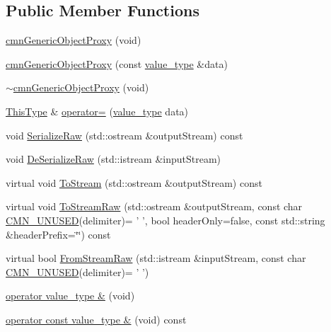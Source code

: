 \subsection*{Public Member Functions}
\begin{DoxyCompactItemize}
\item 
\hyperlink{classcmn_generic_object_proxy_a3a7b07e56467bd563879e5e3fa71b3bf}{cmn\-Generic\-Object\-Proxy} (void)
\item 
\hyperlink{classcmn_generic_object_proxy_aec23f04b937e22288af731b9c9714b02}{cmn\-Generic\-Object\-Proxy} (const \hyperlink{classcmn_generic_object_proxy_a5a3db96e5acd73055d5d34c25c1635f3}{value\-\_\-type} \&data)
\item 
\hyperlink{classcmn_generic_object_proxy_aea3ad15723db9a0c1924936fd25910e6}{$\sim$cmn\-Generic\-Object\-Proxy} (void)
\item 
\hyperlink{classcmn_generic_object_proxy_a4ad0391ca48ebfb86d6bbda89a98c99d}{This\-Type} \& \hyperlink{classcmn_generic_object_proxy_aa4c5ad5bd8655ed6974c9dcbf096dc90}{operator=} (\hyperlink{classcmn_generic_object_proxy_a5a3db96e5acd73055d5d34c25c1635f3}{value\-\_\-type} data)
\item 
void \hyperlink{classcmn_generic_object_proxy_adaa26a00b9f13b78647282c0badc6cb2}{Serialize\-Raw} (std\-::ostream \&output\-Stream) const 
\item 
void \hyperlink{classcmn_generic_object_proxy_a62d6acac550f9e25469256e2cec9edb9}{De\-Serialize\-Raw} (std\-::istream \&input\-Stream)
\item 
virtual void \hyperlink{classcmn_generic_object_proxy_a595129d5bb131263104a840967c7580d}{To\-Stream} (std\-::ostream \&output\-Stream) const 
\item 
virtual void \hyperlink{classcmn_generic_object_proxy_a7741c043f8f9c07559b6a66d8e411fe6}{To\-Stream\-Raw} (std\-::ostream \&output\-Stream, const char \hyperlink{cmn_portability_8h_a021894e2626935fa2305434b1e893ff6}{C\-M\-N\-\_\-\-U\-N\-U\-S\-E\-D}(delimiter)= ' ', bool header\-Only=false, const std\-::string \&header\-Prefix=\char`\"{}\char`\"{}) const 
\item 
virtual bool \hyperlink{classcmn_generic_object_proxy_af76004eb71b542b5e96d1790db55156d}{From\-Stream\-Raw} (std\-::istream \&input\-Stream, const char \hyperlink{cmn_portability_8h_a021894e2626935fa2305434b1e893ff6}{C\-M\-N\-\_\-\-U\-N\-U\-S\-E\-D}(delimiter)= ' ')
\end{DoxyCompactItemize}
{\bf }\par
\begin{DoxyCompactItemize}
\item 
\hyperlink{classcmn_generic_object_proxy_ad73eae195ede0ec2a76eea5782ad7662}{operator value\-\_\-type \&} (void)
\item 
\hyperlink{classcmn_generic_object_proxy_ae14120d331171dfd20e03086f1baa72e}{operator const value\-\_\-type \&} (void) const 
\end{DoxyCompactItemize}

